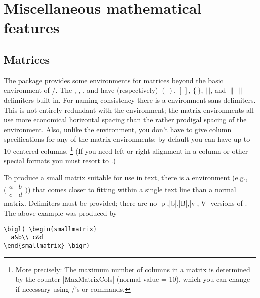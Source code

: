 \documentclass[leqno,titlepage,openany]{amsldoc}[1999/12/13]
\begin{document}

\chapter{Miscellaneous mathematical features}

\section{Matrices}\label{ss:matrix}

The  package provides some environments for
matrices beyond the basic  environment of
\latex/. The , , , 
and  have (respectively) $(\,)$, $[\,]$, $\lbrace\,\rbrace$,
$\lvert\,\rvert$, and
$\lVert\,\rVert$ delimiters built in. For naming consistency there is a
 environment sans delimiters. This is not entirely redundant
with the  environment; the matrix environments all use more
economical horizontal spacing than the rather prodigal spacing of the
 environment. Also, unlike the  environment, you
don't have to give column specifications for any of the matrix
environments; by default you can have up to 10 centered columns.%
\footnote{%
More precisely: The maximum number of columns in a matrix is determined
by the counter |MaxMatrixCols| (normal value = 10), which you can change
if necessary using \latex/'s  or 
commands.%
}\space%
(If you need left or right alignment in a column or other special
formats you must resort to .)

To produce a small matrix suitable for use in text, there is a
 environment (e.g.,
\begin{math}
\bigl( \begin{smallmatrix}
  a&b\\ c&d
\end{smallmatrix} \bigr)
\end{math})
that comes closer to fitting within a single text line than a normal
matrix. Delimiters must be provided; there are no |p|,|b|,|B|,|v|,|V|
versions of . The above example was produced by
\begin{verbatim}
\bigl( \begin{smallmatrix}
  a&b\\ c&d
\end{smallmatrix} \bigr)
\end{verbatim}
\end{document}
